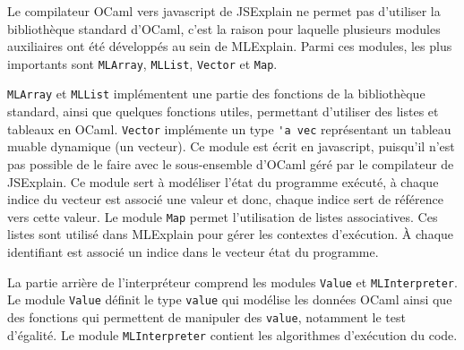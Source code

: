 \documentclass{easychair}
\begin{document}
Le compilateur OCaml vers javascript de JSExplain ne permet pas d'utiliser la 
bibliothèque standard d'OCaml, c'est la raison pour laquelle plusieurs modules 
auxiliaires ont été développés au sein de MLExplain. Parmi ces modules, les 
plus importants sont \verb|MLArray|, \verb|MLList|, \verb|Vector| et 
\verb|Map|.

\verb|MLArray| et \verb|MLList| implémentent une partie des fonctions de la 
bibliothèque standard, ainsi que quelques fonctions utiles, permettant 
d'utiliser des listes et tableaux en OCaml. \verb|Vector| implémente un type 
\verb|'a vec| représentant un tableau muable dynamique (un vecteur). Ce module 
est écrit en javascript, puisqu'il n'est pas possible de le faire avec le 
sous-ensemble d'OCaml géré par le compilateur de JSExplain. Ce module sert à 
modéliser l'état du programme exécuté, à chaque indice du vecteur est associé 
une valeur et donc, chaque indice sert de référence vers cette valeur. Le 
module \verb|Map| permet l'utilisation de listes associatives. Ces listes sont 
utilisé dans MLExplain pour gérer les contextes d'exécution. À chaque 
identifiant est associé un indice dans le vecteur état du programme.

La partie arrière de l'interpréteur comprend les modules \verb|Value| et 
\verb|MLInterpreter|. Le module \verb|Value| définit le type \verb|value| qui 
modélise les données OCaml ainsi que des fonctions qui permettent de manipuler 
des \verb|value|, notamment le test d'égalité. Le module \verb|MLInterpreter| 
contient les algorithmes d'exécution du code.


\end{document}
